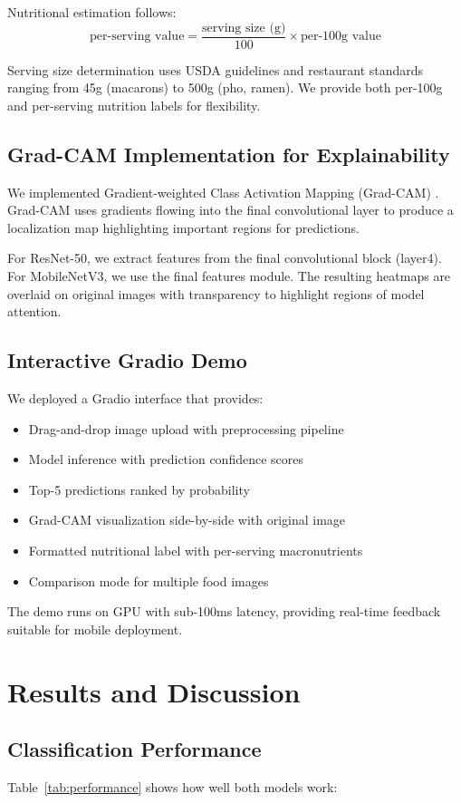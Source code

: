 \documentclass[conference]{IEEEtran}
\begin{document}
Nutritional estimation follows:
\begin{equation}
\text{per-serving value} = \frac{\text{serving size (g)}}{100} \times \text{per-100g value}
\end{equation}

Serving size determination uses USDA guidelines and restaurant standards ranging from 45g (macarons) to 500g (pho, ramen). We provide both per-100g and per-serving nutrition labels for flexibility.

\subsection{Grad-CAM Implementation for Explainability}
We implemented Gradient-weighted Class Activation Mapping (Grad-CAM) \cite{selvaraju2017gradcam}. Grad-CAM uses gradients flowing into the final convolutional layer to produce a localization map highlighting important regions for predictions.

For ResNet-50, we extract features from the final convolutional block (layer4). For MobileNetV3, we use the final features module. The resulting heatmaps are overlaid on original images with transparency to highlight regions of model attention.

\subsection{Interactive Gradio Demo}
We deployed a Gradio interface that provides:
\begin{itemize}
    \item Drag-and-drop image upload with preprocessing pipeline
    \item Model inference with prediction confidence scores
    \item Top-5 predictions ranked by probability
    \item Grad-CAM visualization side-by-side with original image
    \item Formatted nutritional label with per-serving macronutrients
    \item Comparison mode for multiple food images
\end{itemize}
The demo runs on GPU with sub-100ms latency, providing real-time feedback suitable for mobile deployment.

\section{Results and Discussion}
\subsection{Classification Performance}
Table~\ref{tab:performance} shows how well both models work:
\end{document}
